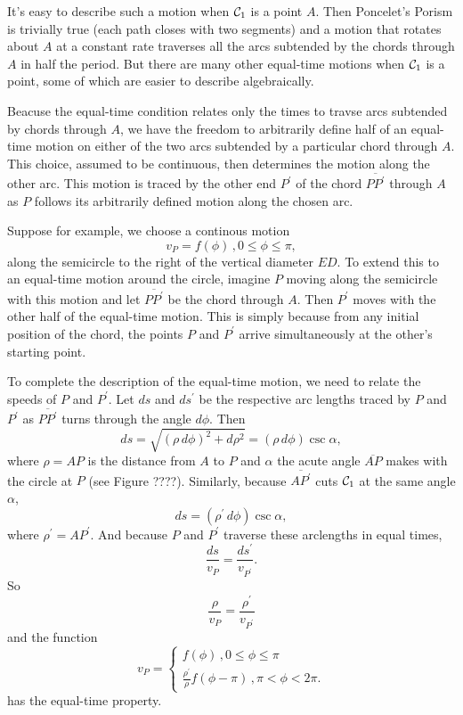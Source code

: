 \documentclass{ximera}
\begin{document}
It's easy to describe such a motion when ${\cal C}_1$ is a point $A$. Then Poncelet's Porism is trivially true (each path closes with two segments) and a motion that rotates about $A$ at a constant rate traverses all the arcs subtended by the chords through $A$ in half the period. But there are many other equal-time motions when ${\cal C}_1$ is a point, some of which are easier to describe algebraically. 

Beacuse the equal-time condition relates only the times to travse arcs subtended by chords through $A$, we have the freedom to arbitrarily define half of an equal-time motion on either of the two arcs subtended by a particular chord through $A$. This choice, assumed to be continuous, then determines the motion along the other arc. This motion is traced by the other end $P^\prime$ of the chord $\overline{PP^\prime}$ through $A$ as $P$ follows its arbitrarily defined motion along the chosen arc.

Suppose for example, we choose a continous motion 
\[
   v_P = f(\phi) \, , 0\leq \phi \leq \pi , 
\]
along the semicircle to the right of the vertical diameter $ED$. To extend this to an equal-time motion around the circle, imagine $P$ moving along the semicircle with this motion and let $\overline{PP^\prime}$ be the chord through $A$. Then $P^\prime$ moves with the other half of the equal-time motion. This is simply because from any initial position of the chord, the points $P$ and $P^\prime$ arrive simultaneously at the other's starting point.

To complete the description of the equal-time motion, we need to relate the speeds of $P$ and $P^\prime$. Let $ds$ and $ds^\prime$ be the respective arc lengths traced by $P$ and $P^\prime$ as $\overline{PP^\prime}$ turns through the angle $d\phi$. Then 
\[
   ds =  \sqrt{(\rho \, d\phi)^2 + d\rho^2}   =   (\rho \, d\phi) \csc \alpha ,
\]
where $\rho = AP$ is the distance from $A$ to $P$ and $\alpha$ the acute angle $\overline{AP}$ makes with the circle at $P$ (see Figure ????). Similarly, because $\overline{AP^\prime}$ cuts ${\cal C}_1$ at the same angle $\alpha$,
\[
   ds =   (\rho^\prime \, d\phi) \csc \alpha ,
\]
where $\rho^\prime = AP^\prime$. And because $P$ and $P^\prime$ traverse these arclengths in equal times,
\[
   \frac{ds}{v_P} = \frac{ds^\prime}{v_{P^\prime}} .
\] 
So
\[
    \frac{\rho}{v_P} = \frac{\rho^\prime}{v_{P^\prime}}
\]
and the function
\[
   v_P =  
\begin{cases}
          f(\phi) \, , 0\leq \phi \leq \pi \\
         \frac{\rho^\prime}{\rho} f(\phi-\pi) \, , \pi < \phi < 2\pi.
\end{cases}
\]
has the equal-time property.
\end{document}
